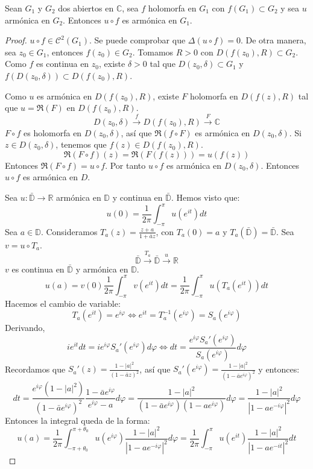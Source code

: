 \begin{lemma}
    Sean $G_1$ y $G_2$ dos abiertos en $\mathbb{C}$, sea $f$ holomorfa en $G_1$ con $f(G_1) \subset G_2$ y sea $u$ armónica en $G_2$.
    Entonces $u \circ f$ es armónica en $G_1$.
\end{lemma}

\begin{proof}
    $u \circ f \in \mathcal{C}^2(G_1)$.
    Se puede comprobar que $\Delta(u \circ f) = 0$.
    De otra manera, sea $z_0 \in G_1$, entonces $f(z_0) \in G_2$.
    Tomamos $R > 0$ con $D(f(z_0), R) \subset G_2$.
    Como $f$ es continua en $z_0$, existe $\delta > 0$ tal que $D(z_0, \delta) \subset G_1$ y $f(D(z_0, \delta)) \subset D(f(z_0), R)$.

    Como $u$ es armónica en $D(f(z_0), R)$, existe $F$ holomorfa en $D(f(z), R)$ tal que $u = \Re(F)$ en $D(f(z_0), R)$.
    $$D(z_0, \delta) \xrightarrow{f} D(f(z_0), R) \xrightarrow{F} \mathbb{C}$$
    $F \circ f$ es holomorfa en $D(z_0, \delta)$, así que $\Re(f \circ F)$ es armónica en $D(z_0, \delta)$.
    Si $z \in D(z_0, \delta)$, tenemos que $f(z) \in D(f(z_0), R)$.
    $$\Re(F \circ f)(z) = \Re(F(f(z))) = u(f(z))$$
    Entonces $\Re(F \circ f) = u \circ f$.
    Por tanto $u \circ f$ es armónica en $D(z_0, \delta)$.
    Entonces $u \circ f$ es armónica en $D$.

    Sea $u: \bar{\mathbb{D}} \to \mathbb{R}$ armónica en $\mathbb{D}$ y continua en $\bar{\mathbb{D}}$.
    Hemos visto que:
    $$u(0) = \frac{1}{2\pi} \int_{-\pi}^\pi u(e^{it})dt$$
    Sea $a \in \mathbb{D}$.
    Consideramos $T_a(z) = \frac{z+a}{1+\bar{a}z}$, con $T_a(0) = a$ y $T_a(\bar{\mathbb{D}}) = \bar{\mathbb{D}}$.
    Sea $v = u \circ T_a$.
    $$\bar{\mathbb{D}} \xrightarrow{T_a} \bar{\mathbb{D}} \xrightarrow{u} \mathbb{R}$$
    $v$ es continua en $\bar{\mathbb{D}}$ y armónica en $\mathbb{D}$.
    $$u(a) = v(0) \frac{1}{2\pi} \int_{-\pi}^\pi v(e^{it})dt = \frac{1}{2\pi} \int_{-\pi}^\pi u(T_a(e^{it}))dt$$
    Hacemos el cambio de variable:
    $$T_a(e^{it}) = e^{i\varphi} \Leftrightarrow e^{it} = T_a^{-1}(e^{i\varphi}) = S_a(e^{i\varphi})$$
    Derivando,
    $$ie^{it}dt = ie^{i\varphi}S_a'(e^{i\varphi})d\varphi \Leftrightarrow dt = \frac{e^{i\varphi}S_a'(e^{i\varphi})}{S_a(e^{i\varphi})}d\varphi$$
    Recordamos que $S_a'(z) = \frac{1-|a|^2}{(1-\bar{a}z)^2}$, así que $S_a'(e^{i\varphi}) = \frac{1-|a|^2}{(1-\bar{a}e^{i\varphi})^2}$ y entonces:
    $$dt = \frac{e^{i\varphi}(1-|a|^2)}{(1-\bar{a}e^{i\varphi})^2}\frac{1-\bar{a}e^{i\varphi}}{e^{i\varphi}-a}d\varphi = \frac{1-|a|^2}{(1-\bar{a}e^{i\varphi})(1-ae^{i\varphi})}d\varphi = \frac{1-|a|^2}{|1-ae^{-i\varphi}|^2}d\varphi$$
    Entonces la integral queda de la forma:
    $$u(a) = \frac{1}{2\pi} \int_{-\pi + \theta_0}^{\pi + \theta_0} u(e^{i\varphi})\frac{1-|a|^2}{|1-ae^{-i\varphi}|^2}d\varphi = \frac{1}{2\pi} \int_{-\pi}^\pi u(e^{it})\frac{1-|a|^2}{|1-ae^{-it}|^2}dt$$
\end{proof}

